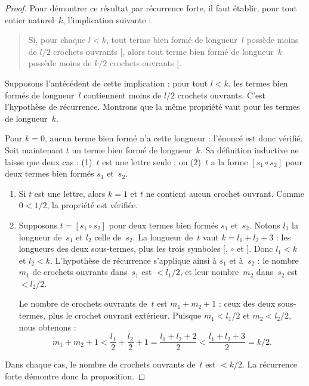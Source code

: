 \documentclass[../../../include/open-logic-section]{subfiles}
\begin{document}
\begin{proof}
Pour démontrer ce
résultat par récurrence
forte, il faut établir, pour tout entier naturel~$k$,
l'implication suivante :
\begin{quote}
  Si, pour chaque
  $l<k$, tout terme
  bien formé de
  longueur~$l$
  possède moins
  de $l/2$
  crochets ouvrants
  $[$, alors
  tout terme bien
  formé de
  longueur~$k$
  possède moins
  de $k/2$
  crochets
  ouvrants $[$.
\end{quote}
Supposons l'antécédent
de cette implication :
pour tout $l<k$,
les termes bien
formés de longueur~$l$
contiennent moins
de $l/2$ crochets
ouvrants. C'est
l'hypothèse de
récurrence. Montrons
que la même propriété
vaut pour les termes
de longueur~$k$.

Pour $k=0$, aucun terme bien formé n'a cette longueur :
l'énoncé est donc vérifié. Soit maintenant $t$ un terme bien
formé de longueur~$k$.
Sa définition inductive
ne laisse que deux
cas : (1)~$t$ est
une lettre seule ;
ou (2)~$t$ a
la forme
$[s_1 \circ s_2]$
pour deux termes
bien formés
$s_1$ et~$s_2$.
\begin{enumerate}
\item Si $t$ est
  une lettre,
  alors $k=1$
  et $t$ ne
  contient aucun
  crochet ouvrant.
  Comme $0<1/2$,
  la propriété
  est vérifiée.
\item Supposons
  $t=[s_1 \circ s_2]$
  pour deux termes
  bien formés
  $s_1$ et~$s_2$.
  Notons $l_1$
  la longueur
  de~$s_1$ et
  $l_2$ celle
  de~$s_2$.
  La longueur
  de~$t$ vaut
  $k=l_1+l_2+3$ :
  les longueurs
  des deux sous-termes,
  plus les trois
  symboles $[$,
  $\circ$ et $]$.
  Donc $l_1<k$
  et $l_2<k$.
  L'hypothèse de
  récurrence s'applique
  ainsi à $s_1$
  et à~$s_2$ :
  le nombre~$m_1$
  de crochets
  ouvrants dans~$s_1$
  est $<l_1/2$,
  et leur nombre~$m_2$
  dans~$s_2$
  est $<l_2/2$.

  Le nombre de
  crochets ouvrants
  de~$t$ est
  $m_1+m_2+1$ :
  ceux des deux
  sous-termes,
  plus le crochet
  ouvrant extérieur.
  Puisque
  $m_1<l_1/2$
  et $m_2<l_2/2$,
  nous obtenons :
  \[
  m_1 + m_2 + 1
  < \frac{l_1}{2}
    + \frac{l_2}{2} + 1
  = \frac{l_1+l_2+2}{2}
  < \frac{l_1+l_2+3}{2}
  = k/2.
  \]
\end{enumerate}
Dans chaque cas,
le nombre de
crochets ouvrants
de~$t$ est $<k/2$.
La récurrence
forte démontre
donc la proposition.
\end{proof}
\end{document}
